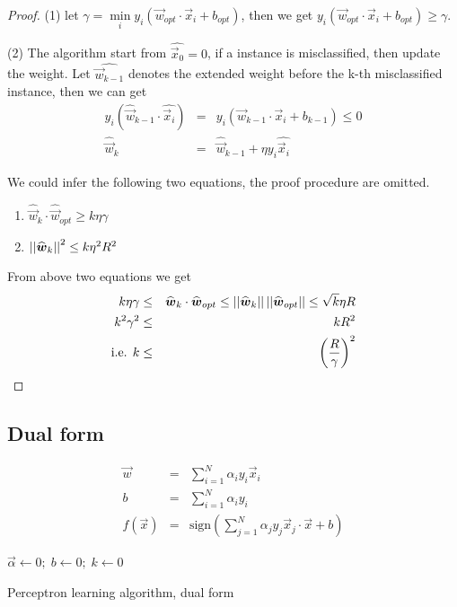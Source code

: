 \begin{proof}
(1) let $\gamma=\min\limits_{i} y_i(\vec{w}_{opt} \cdot \vec{x}_i+b_{opt})$, then we get $y_i(\vec{w}_{opt} \cdot \vec{x}_i+b_{opt}) \geq \gamma$.

(2) The algorithm start from $\widehat{\vec{x}_0}=0$, if a instance is misclassified, then update the weight. Let $\widehat{\vec{w}_{k-1}}$ denotes the extended weight before the k-th misclassified instance, then we can get
\begin{eqnarray}
y_i(\widehat{\vec{w}}_{k-1} \cdot \widehat{\vec{x}_i})&=&y_i(\vec{w}_{k-1} \cdot \vec{x}_i+b_{k-1}) \leq 0\\
\widehat{\vec{w}}_k&=&\widehat{\vec{w}}_{k-1}+\eta y_i \widehat{\vec{x}_i}
\end{eqnarray}

We could infer the following two equations, the proof procedure are omitted.
\begin{enumerate}
\item $\widehat{\vec{w}}_k \cdot \widehat{\vec{w}}_{opt} \geq k\eta\gamma$
\item $\abs{\abs{\widehat{\vec{w}}_k}}^2 \leq k\eta^2R^2$
\end{enumerate}

From above two equations we get
\begin{eqnarray}
\nonumber k\eta\gamma & \leq & \widehat{\vec{w}}_k \cdot \widehat{\vec{w}}_{opt} \leq \abs{\abs{\widehat{\vec{w}}_k}}\abs{\abs{\widehat{\vec{w}}_{opt}}} \leq \sqrt k \eta R \\
\nonumber k^2\gamma^2 & \leq & kR^2 \\
\nonumber \text{i.e. } k & \leq & \left(\dfrac{R}{\gamma}\right)^2
\end{eqnarray}
\end{proof}

\subsection{Dual form}
\begin{eqnarray}
\vec{w}&=&\sum\limits_{i=1}^{N} \alpha_iy_i\vec{x}_i \\
b&=&\sum\limits_{i=1}^{N} \alpha_iy_i \\
f(\vec{x})&=&\text{sign}\left(\sum\limits_{j=1}^{N} \alpha_jy_j\vec{x}_j \cdot \vec{x}+b\right)
\end{eqnarray}

\begin{algorithm}[htbp]
    \SetAlgoNoLine
  
    $\vec{\alpha} \leftarrow 0;\; b \leftarrow 0;\; k \leftarrow 0$\;
\caption{Perceptron learning algorithm, dual form}
\end{algorithm}
